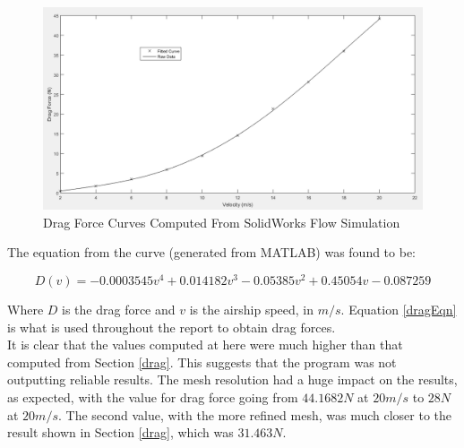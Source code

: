 \documentclass[../main.tex]{subfiles}
\begin{document}
\begin{figure}[H]
	\centering
	\includegraphics[width=\linewidth]{img/drag/curveFit.PNG}
	\caption{Drag Force Curves Computed From SolidWorks Flow Simulation}
	\label{fig:curveFit}
\end{figure}

The equation from the curve (generated from MATLAB) was found to be:

\begin{equation} \label{dragEqn}
	D(v) = -0.0003545v^4 + 0.014182v^3 -0.05385v^2 + 0.45054v -0.087259
\end{equation}

Where $ D $ is the drag force and $ v $ is the airship speed, in $m/s$. Equation \ref{dragEqn} is what is used throughout the report to obtain drag forces.\\

It is clear that the values computed at here were much higher than that computed from Section \ref{drag}. This suggests that the program was not outputting reliable results. The mesh resolution had a huge impact on the results, as expected, with the value for drag force going from $ 44.1682N $ at $ 20m/s $ to $ 28N $ at $ 20m/s $. The second value, with the more refined mesh, was much closer to the result shown in Section \ref{drag}, which was $31.463N$.
\end{document}
